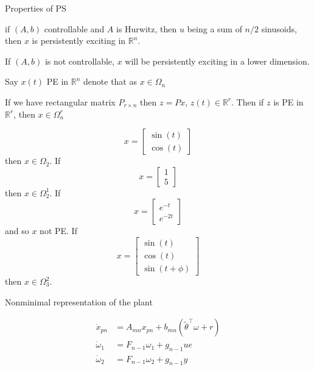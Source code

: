 Properties of PS

if $(A,b)$ controllable and $A$ is Hurwitz, then $u$ being a sum of $n/2$ sinusoids, then $x$ is persistently exciting in $\mathbb{R}^{n}$.

If $(A,b)$ is not controllable, $x$ will be persistently exciting in a lower dimension.

Say $x(t)$ PE in $\mathbb{R}^{n}$ denote that as $x\in\Omega_{n}$

If we have rectangular matrix $P_{r\times n}$ then $z=Px$, $z(t)\in\mathbb{R}^{r}$.
Then if $z$ is PE in $\mathbb{R}^{r}$, then $x\in\Omega_{n}^{r}$

\begin{example}[]
  \begin{equation*}
    x=
    \begin{bmatrix}
      \sin(t) \\
      \cos(t)
    \end{bmatrix}
  \end{equation*}
  then $x\in\Omega_{2}$.
  If
  \begin{equation*}
    x=
    \begin{bmatrix}
    1 \\
    5
    \end{bmatrix}
  \end{equation*}
  then $x\in\Omega_{2}^{1}$.
  If
  \begin{equation*}
    x=
    \begin{bmatrix}
      e^{-t} \\
      e^{-2t}
    \end{bmatrix}
  \end{equation*}
  and so $x$ not PE.\@
  If
  \begin{equation*}
    x=
    \begin{bmatrix}
      \sin(t) \\
      \cos(t) \\
      \sin(t+\phi)
    \end{bmatrix}
  \end{equation*}
  then $x\in\Omega_{3}^{2}$.
\end{example}

Nonminimal representation of the plant

\begin{align*}
  \dot{x}_{pn}&=A_{mn}x_{pn}+b_{mn}(\tilde{\theta}^{\top}\omega+r) \\
  \dot{\omega}_{1}&=F_{n-1}\omega_{1}+g_{n-1}ue \\
  \dot{\omega}_{2}&=F_{n-1}\omega_{2}+g_{n-1}y
\end{align*}

